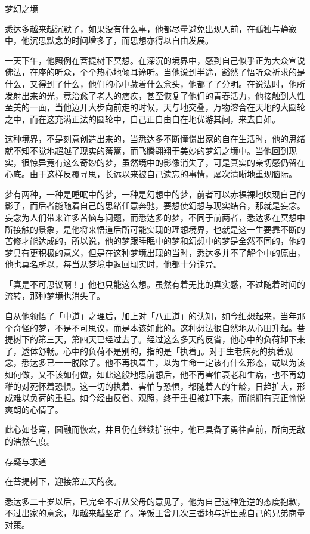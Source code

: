 \documentclass[12pt,twoside,openany]{book}
\begin{document}
梦幻之境

悉达多越来越沉默了，如果没有什么事，他都尽量避免出现人前，在孤独与静寂中，他沉思默念的时间增多了，而思想亦得以自由发展。

一天下午，他照例在菩提树下冥想。在深沉的境界中，感到自己似乎正为大众宣说佛法，在座的听众，个个热心地倾耳谛听。当他说到半途，豁然了悟听众祈求的是什么，又得到了什么，他们的心中藏着什么念头，他都了了分明。在说法时，他所发射出来的光，竟治愈了老人的痼疾，甚至恢复了他们的青春活力，他接触到人性至美的一面，当他迈开大步向前走的时候，天与地交叠，万物溶合在天地的大圆轮之中，而在这充满正法的圆轮中，自己正自由自在地优游其间，来去自如。

这种境界，不是刻意创造出来的，当悉达多不断憧憬出家的自在生活时，他的思绪就不知不觉地超越了现实的藩篱，而飞腾翱翔于美妙的梦幻之境中。当他回到现实，很惊异竟有这么奇妙的梦，虽然境中的影像消失了，可是真实的亲切感仍留在心底。由于这样反覆寻思，长远以来被自己遗忘的事情，屡次清晰地重现脑际。

梦有两种，一种是睡眠中的梦，一种是幻想中的梦，前者可以赤裸裸地映现自己的影子，而后者能随着自己的思绪任意奔驰，要想使幻想与现实结合，那就是妄念。妄念为人们带来许多苦恼与问题，而悉达多的梦，不同于前两者，悉达多在冥想中所接触的景象，是他将来悟道后所可能实现的理想境界，也就是这一生要靠不断的苦修才能达成的，所以说，他的梦跟睡眠中的梦和幻想中的梦是全然不同的，他的梦具有更积极的意义，但是在这种梦境出现的当时，悉达多并不了解个中的原由，他也莫名所以，每当从梦境中返回现实时，他都十分诧异。

「真是不可思议啊！」他也只能这么想。虽然有着无比的真实感，不过随着时间的流转，那种梦境也消失了。

自从他领悟了「中道」之理后，加上对「八正道」的认知，如今细想起来，当年那个奇怪的梦，不是不可思议，而是本该如此的。这种想法很自然地从心田升起。菩提树下的第三天，第四天已经过去了。经过这么多天的反省，他心中的负荷卸下来了，透体舒畅。心中的负荷不是别的，指的是「执着」。对于生老病死的执着观念，悉达多已一一脱除了。他不再执着生，以为生命一定该有什么形态，或以为该如何做，又不该如何做，如此这般地思前想后，他不再害怕衰老和生病，也不再幼稚的对死怀着恐惧。这一切的执着、害怕与恐惧，都随着人的年龄，日趋扩大，形成难以负荷的重担。如今经由反省、观照，终于重担被卸下来，而能拥有真正愉悦爽朗的心情了。

此心如苍穹，圆融而恢宏，并且仍在继续扩张中，他已具备了勇往直前，所向无敌的浩然气度。

存疑与求道

在菩提树下，迎接第五天的夜。

悉达多二十岁以后，已完全不听从父母的意见了，他为自己这种迕逆的态度抱歉，不过出家的意念，却越来越坚定了。净饭王曾几次三番地与近臣或自己的兄弟商量对策。
\end{document}
